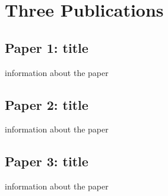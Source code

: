 \chapter{Three Publications}
\label{sicpapes}

\section{Paper 1: title}

information about the paper



\section{Paper 2: title}

information about the paper



\section{Paper 3: title}

information about the paper


